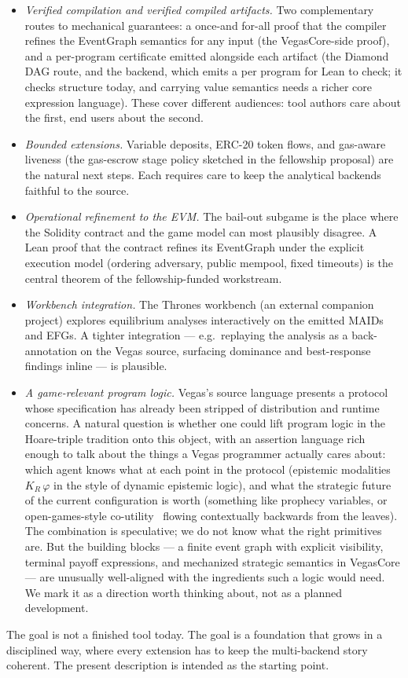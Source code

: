 \begin{itemize}\itemsep2pt
\item \emph{Verified compilation and verified compiled artifacts.}
  Two complementary routes to mechanical guarantees: a once-and
  for-all proof that the compiler refines the EventGraph
  semantics for any input (the VegasCore-side proof), and a
  per-program certificate emitted alongside each artifact (the
  Diamond DAG route, and the  backend, which emits a
   per program for Lean to check; it checks
  structure today, and carrying value semantics needs a richer
  core expression language).  These cover
  different audiences: tool authors care about the first, end
  users about the second.
\item \emph{Bounded extensions.}  Variable deposits, ERC-20
  token flows, and gas-aware liveness (the gas-escrow stage
  policy sketched in the fellowship proposal) are the natural
  next steps.  Each requires care to keep the analytical
  backends faithful to the source.
\item \emph{Operational refinement to the EVM.}  The bail-out
  subgame is the place where the Solidity contract and the
  game model can most plausibly disagree.  A Lean proof that
  the contract refines its EventGraph under the explicit
  execution model (ordering adversary, public mempool, fixed
  timeouts) is the central theorem of the fellowship-funded
  workstream.
\item \emph{Workbench integration.}  The Thrones workbench (an
  external companion project) explores equilibrium analyses
  interactively on the emitted MAIDs and EFGs.  A tighter
  integration --- e.g.\ replaying the analysis as a
  back-annotation on the Vegas source, surfacing dominance and
  best-response findings inline --- is plausible.

\item \emph{A game-relevant program logic.}  Vegas's source
  language presents a protocol whose specification has already
  been stripped of distribution and runtime concerns.  A natural
  question is whether one could lift program logic in the
  Hoare-triple tradition onto this object, with an assertion
  language rich enough to talk about the things a Vegas
  programmer actually cares about: which agent knows what at
  each point in the protocol (epistemic modalities $K_R\,\varphi$
  in the style of dynamic epistemic logic), and what the
  strategic future of the current configuration is worth
  (something like prophecy variables, or open-games-style
  co-utility~\citep{GhaniHedgesWinschel2018CGT} flowing
  contextually backwards from the leaves).  The combination is
  speculative; we do not know what the right primitives are.
  But the building blocks --- a finite event graph with
  explicit visibility, terminal payoff expressions, and
  mechanized strategic semantics in VegasCore --- are unusually
  well-aligned with the ingredients such a logic would need.
  We mark it as a direction worth thinking about, not as a
  planned development.
\end{itemize}

The goal is not a finished tool today.  The goal is a
foundation that grows in a disciplined way, where every
extension has to keep the multi-backend story coherent.  The
present description is intended as the starting point.

